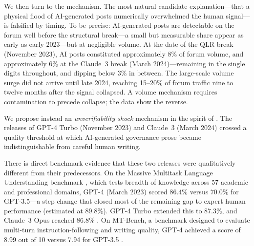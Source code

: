 \documentclass[12pt]{article}
\begin{document}
We then turn to the mechanism. The most natural candidate explanation---that a
physical flood of AI-generated posts numerically overwhelmed the human signal---is
falsified by timing. To be precise: AI-generated posts are detectable on the forum
well before the structural break---a small but measurable share appear as early as
early 2023---but at negligible volume. At the date of the QLR break (November 2023),
AI posts constituted approximately 8\% of forum volume, and approximately 6\% at the Claude~3 break (March 2024)---remaining in the single digits throughout, and dipping below 3\% in between. The large-scale volume surge did not arrive until late 2024, reaching 15--20\% of forum traffic nine to twelve months after the signal collapsed. A volume mechanism requires contamination to precede collapse; the data show the reverse.

We propose instead an \emph{unverifiability shock} mechanism in the spirit of
\citet{akerlof1970}. The releases of GPT-4 Turbo (November 2023) and Claude~3
(March 2024) crossed a quality threshold at which AI-generated governance prose
became indistinguishable from careful human writing.

There is direct benchmark evidence that these two releases were qualitatively different from their predecessors. On the Massive Multitask Language Understanding benchmark \citep[MMLU;][]{hendrycks2021}, which tests breadth of knowledge across 57 academic and professional domains, GPT-4 (March 2023) scored 86.4\% versus 70.0\% for GPT-3.5---a step change that closed most of the remaining gap to expert human performance (estimated at 89.8\%). GPT-4 Turbo extended this to 87.3\%, and Claude~3 Opus reached 86.8\% \citep{anthropic2024}. On MT-Bench, a benchmark designed to evaluate multi-turn instruction-following and writing quality, GPT-4 achieved a score of 8.99 out of 10 versus 7.94 for GPT-3.5 \citep{zheng2023}.
\end{document}
